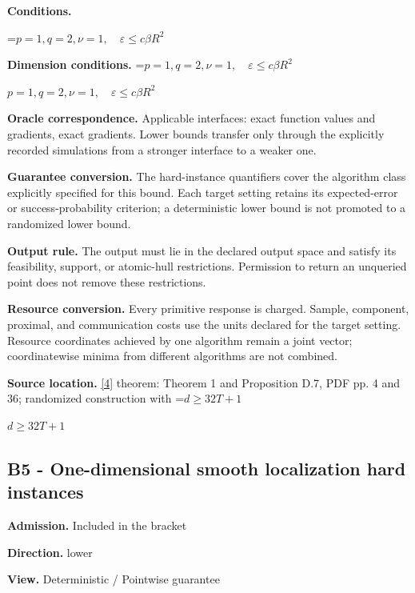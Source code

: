 \documentclass[10pt,a4paper]{article}
\newcommand{\AtlasMath}[1]{\par\begingroup\centering\setbox0=\hbox{$\displaystyle #1$}\ifdim\wd0>1.4\linewidth\typeout{ATLAS WIDE FORMULA: \the\wd0}\fi\ifdim\wd0>\linewidth\resizebox{\linewidth}{!}{\box0}\else\box0\fi\par\endgroup}
\newcommand{\AtlasInlineMath}[1]{\begingroup\setbox0=\hbox{$#1$}\ifdim\wd0>.4\linewidth\endgroup\AtlasMath{#1}\else\endgroup$#1$\fi}
\begin{document}
\textbf{Conditions.}
\AtlasMath{p=1,q=2,\nu=1,\quad\varepsilon\le c\beta R^2}




\textbf{Dimension conditions.} \AtlasInlineMath{p=1,q=2,\nu=1,\quad\varepsilon\le c\beta R^2}



\textbf{Oracle correspondence.} Applicable interfaces: exact function values and gradients, exact gradients. Lower bounds transfer only through the explicitly recorded simulations from a stronger interface to a weaker one.



\textbf{Guarantee conversion.} The hard-instance quantifiers cover the algorithm class explicitly specified for this bound. Each target setting retains its expected-error or success-probability criterion; a deterministic lower bound is not promoted to a randomized lower bound.



\textbf{Output rule.} The output must lie in the declared output space and satisfy its feasibility, support, or atomic-hull restrictions. Permission to return an unqueried point does not remove these restrictions.



\textbf{Resource conversion.} Every primitive response is charged. Sample, component, proximal, and communication costs use the units declared for the target setting. Resource coordinates achieved by one algorithm remain a joint vector; coordinatewise minima from different algorithms are not combined.



\textbf{Source location.} \href{https://arxiv.org/pdf/2609.32910}{[4]} theorem: Theorem 1 and Proposition D.7, PDF pp. 4 and 36; randomized construction with \AtlasInlineMath{d\ge32T+1}



\subsection{B5 - One-dimensional smooth localization hard instances}


\textbf{Admission.} Included in the bracket



\textbf{Direction.} lower



\textbf{View.} Deterministic / Pointwise guarantee
\end{document}

